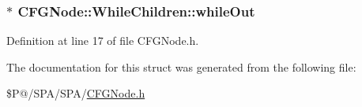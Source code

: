 \hypertarget{struct_c_f_g_node_1_1_while_children_aa7eacf6afada7bab8a07c677fc5466d5}{
\subsubsection[{while\-Out}]{$\ast$ C\-F\-G\-Node\-::\-While\-Children\-::while\-Out}}\label{struct_c_f_g_node_1_1_while_children_aa7eacf6afada7bab8a07c677fc5466d5}


Definition at line 17 of file C\-F\-G\-Node.\-h.



The documentation for this struct was generated from the following file\-:\begin{DoxyCompactItemize}
\item 
\$\-P@/\-S\-P\-A/\-S\-P\-A/\hyperlink{_c_f_g_node_8h}{C\-F\-G\-Node.\-h}\end{DoxyCompactItemize}
